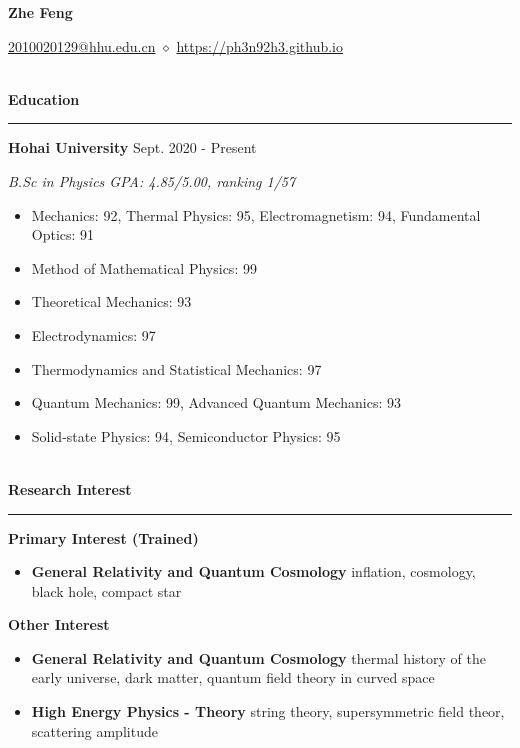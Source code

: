 \documentclass[12pt]{article}
\newcommand{\sect}[1]{
    ~\\ \noindent \textbf{#1} \medskip \hrule \medskip
}
\begin{document}
\pagestyle{empty}


\begin{center}
    \LARGE{\textbf{Zhe Feng}}
\end{center}

\begin{center}
    \href{mailto:2010020129@hhu.edu.cn}{2010020129@hhu.edu.cn} $\diamond$ \href{https://ph3n92h3.github.io}{https://ph3n92h3.github.io}
\end{center}


\sect{Education}

\textbf{Hohai University} \hfill Sept. 2020 - Present

\textit{B.Sc in Physics \hfill GPA: 4.85/5.00, ranking 1/57}

\begin{itemize}[noitemsep,nolistsep]
    \item Mechanics: 92, Thermal Physics: 95, Electromagnetism: 94, Fundamental Optics: 91
    \item Method of Mathematical Physics: 99
    \item Theoretical Mechanics: 93
    \item Electrodynamics: 97
    \item Thermodynamics and Statistical Mechanics: 97
    \item Quantum Mechanics: 99, Advanced Quantum Mechanics: 93
    \item Solid-state Physics: 94, Semiconductor Physics: 95
\end{itemize}


\sect{Research Interest}

\textbf{Primary Interest (Trained)}
\begin{itemize}[noitemsep,nolistsep]
    \item \textbf{General Relativity and Quantum Cosmology} inflation, cosmology, black hole, compact star
\end{itemize}

\textbf{Other Interest}
\begin{itemize}[noitemsep,nolistsep]
    \item \textbf{General Relativity and Quantum Cosmology} thermal history of the early universe, dark matter, quantum field theory in curved space
    \item \textbf{High Energy Physics - Theory} string theory, supersymmetric field theor, scattering amplitude
\end{itemize}
\end{document}
